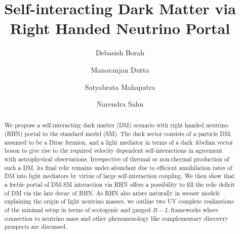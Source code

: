 \documentclass[prd,nofootinbib,preprint,superscriptaddress]{revtex4}
\begin{document}
	\title{Self-interacting Dark Matter via Right Handed Neutrino Portal}
	
	\author{Debasish Borah}
	
	\author{Manoranjan Dutta}
	
	\author{Satyabrata Mahapatra}
	
	
	\author{Narendra Sahu}
	
	\begin{abstract}
		We propose a self-interacting dark matter (DM) scenario with right handed neutrino (RHN) portal to the standard model (SM). 
		The dark sector consists of a particle DM, assumed to be a Dirac fermion, and a light mediator in terms of a 
		dark Abelian vector boson to give rise to the required velocity dependent self-interactions in agreement with astrophysical observations. 
		Irrespective of thermal or non-thermal production of such a DM, its 
		final relic remains under-abundant due to efficient annihilation rates of DM into light mediators by virtue of large 
		self-interaction coupling. We then show that a feeble portal of DM-SM interaction via RHN offers a possibility to fill the relic 
		deficit of DM via the late decay of RHN. As RHN also arises naturally in seesaw models explaining the origin of light neutrino masses, we outline two UV complete realizations of the minimal setup in terms of scotogenic and gauged $B-L$ frameworks 
		where connection to neutrino mass and other phenomenology like complementary discovery prospects are discussed. 
	\end{abstract}	
	\maketitle
\end{document}
